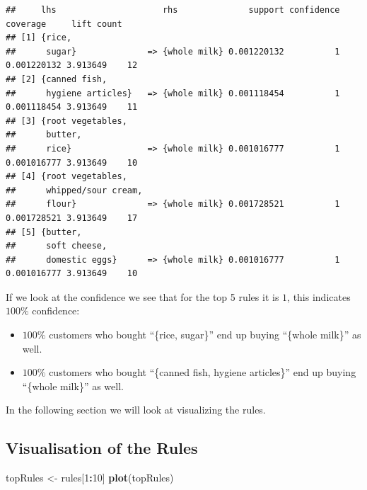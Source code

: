 \documentclass[
]{book}
\newenvironment{Shaded}{\begin{snugshade}}{\end{snugshade}}
\newcommand{\DecValTok}[1]{\textcolor[rgb]{0.00,0.00,0.81}{#1}}
\newcommand{\KeywordTok}[1]{\textcolor[rgb]{0.13,0.29,0.53}{\textbf{#1}}}
\newcommand{\NormalTok}[1]{#1}
\newcommand{\OperatorTok}[1]{\textcolor[rgb]{0.81,0.36,0.00}{\textbf{#1}}}
\newcommand{\StringTok}[1]{\textcolor[rgb]{0.31,0.60,0.02}{#1}}
\begin{document}
\begin{verbatim}
##     lhs                     rhs              support confidence    coverage     lift count
## [1] {rice,                                                                                
##      sugar}              => {whole milk} 0.001220132          1 0.001220132 3.913649    12
## [2] {canned fish,                                                                         
##      hygiene articles}   => {whole milk} 0.001118454          1 0.001118454 3.913649    11
## [3] {root vegetables,                                                                     
##      butter,                                                                              
##      rice}               => {whole milk} 0.001016777          1 0.001016777 3.913649    10
## [4] {root vegetables,                                                                     
##      whipped/sour cream,                                                                  
##      flour}              => {whole milk} 0.001728521          1 0.001728521 3.913649    17
## [5] {butter,                                                                              
##      soft cheese,                                                                         
##      domestic eggs}      => {whole milk} 0.001016777          1 0.001016777 3.913649    10
\end{verbatim}

If we look at the confidence we see that for the top 5 rules it is \(1\), this indicates \(100\%\) confidence:

\begin{itemize}
\item
  \(100\%\) customers who bought ``\{rice, sugar\}'' end up buying ``\{whole milk\}'' as well.
\item
  \(100\%\) customers who bought ``\{canned fish, hygiene articles\}'' end up buying ``\{whole milk\}'' as well.
\end{itemize}

In the following section we will look at visualizing the rules.

\hypertarget{visualisation-of-the-rules}{%
\subsection{Visualisation of the Rules}\label{visualisation-of-the-rules}}

\begin{Shaded}
\begin{Highlighting}[]
\NormalTok{topRules <-}\StringTok{ }\NormalTok{rules[}\DecValTok{1}\OperatorTok{:}\DecValTok{10}\NormalTok{]}
\KeywordTok{plot}\NormalTok{(topRules)}
\end{Highlighting}
\end{Shaded}
\end{document}
